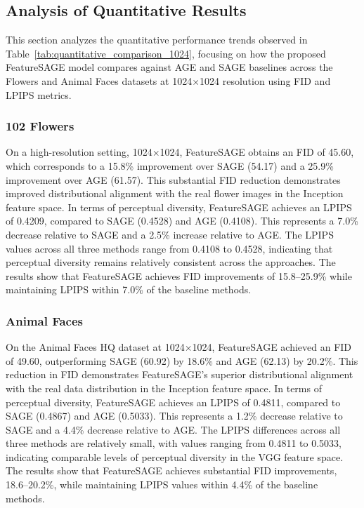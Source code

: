 \subsection{Analysis of Quantitative Results}

This section analyzes the quantitative performance trends observed in Table~\ref{tab:quantitative_comparison_1024}, focusing on how the proposed FeatureSAGE model compares against AGE and SAGE baselines across the Flowers and Animal Faces datasets at 1024$\times$1024 resolution using FID and LPIPS metrics.

\subsubsection{102 Flowers}

On a high-resolution setting, 1024$\times$1024, FeatureSAGE obtains an FID of 45.60, which corresponds to a 15.8\% improvement over SAGE (54.17) and a 25.9\% improvement over AGE (61.57). This substantial FID reduction demonstrates improved distributional alignment with the real flower images in the Inception feature space. In terms of perceptual diversity, FeatureSAGE achieves an LPIPS of 0.4209, compared to SAGE (0.4528) and AGE (0.4108). This represents a 7.0\% decrease relative to SAGE and a 2.5\% increase relative to AGE. The LPIPS values across all three methods range from 0.4108 to 0.4528, indicating that perceptual diversity remains relatively consistent across the approaches. The results show that FeatureSAGE achieves FID improvements of 15.8--25.9\% while maintaining LPIPS within 7.0\% of the baseline methods.

\subsubsection{Animal Faces}

On the Animal Faces HQ dataset at 1024$\times$1024, FeatureSAGE achieved an FID of 49.60, outperforming SAGE (60.92) by 18.6\% and AGE (62.13) by 20.2\%. This reduction in FID demonstrates FeatureSAGE's superior distributional alignment with the real data distribution in the Inception feature space. In terms of perceptual diversity, FeatureSAGE achieves an LPIPS of 0.4811, compared to SAGE (0.4867) and AGE (0.5033). This represents a 1.2\% decrease relative to SAGE and a 4.4\% decrease relative to AGE. The LPIPS differences across all three methods are relatively small, with values ranging from 0.4811 to 0.5033, indicating comparable levels of perceptual diversity in the VGG feature space. The results show that FeatureSAGE achieves substantial FID improvements, 18.6--20.2\%, while maintaining LPIPS values within 4.4\% of the baseline methods.

